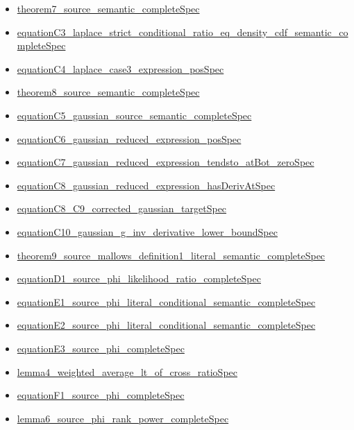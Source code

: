 \documentclass[10pt]{article}
\begin{document}
\begin{itemize}[leftmargin=1.2em]
\begin{itemize}[leftmargin=1.2em]
\item \hyperlink{source-claim-aceb5e75cb75d8b8}{theorem7\_source\_semantic\_completeSpec}
\item \hyperlink{source-claim-fb611bb534f07b11}{equationC3\_laplace\_strict\_conditional\_ratio\_eq\_density\_cdf\_semantic\_completeSpec}
\item \hyperlink{source-claim-29d2b7baa5996f3d}{equationC4\_laplace\_case3\_expression\_posSpec}
\item \hyperlink{source-claim-33bdbb546218e99a}{theorem8\_source\_semantic\_completeSpec}
\item \hyperlink{source-claim-43364c7dea10aac0}{equationC5\_gaussian\_source\_semantic\_completeSpec}
\item \hyperlink{source-claim-c25f59d1a0e8be35}{equationC6\_gaussian\_reduced\_expression\_posSpec}
\item \hyperlink{source-claim-4d39c9a7a45156fa}{equationC7\_gaussian\_reduced\_expression\_tendsto\_atBot\_zeroSpec}
\item \hyperlink{source-claim-2c9d403cd319b538}{equationC8\_gaussian\_reduced\_expression\_hasDerivAtSpec}
\item \hyperlink{source-claim-4139a609895b0de6}{equationC8\_C9\_corrected\_gaussian\_targetSpec}
\item \hyperlink{source-claim-7a440699a84fb997}{equationC10\_gaussian\_g\_inv\_derivative\_lower\_boundSpec}
\item \hyperlink{source-claim-d732fbc16f2ecdeb}{theorem9\_source\_mallows\_definition1\_literal\_semantic\_completeSpec}
\item \hyperlink{source-claim-7751231944a77b74}{equationD1\_source\_phi\_likelihood\_ratio\_completeSpec}
\item \hyperlink{source-claim-c7560a9682e8906d}{equationE1\_source\_phi\_literal\_conditional\_semantic\_completeSpec}
\item \hyperlink{source-claim-73dd5d1917ec1a7c}{equationE2\_source\_phi\_literal\_conditional\_semantic\_completeSpec}
\item \hyperlink{source-claim-027748e89e133285}{equationE3\_source\_phi\_completeSpec}
\item \hyperlink{source-claim-f5654e8ee63c4d5d}{lemma4\_weighted\_average\_lt\_of\_cross\_ratioSpec}
\item \hyperlink{source-claim-7e7ac58d3e77e0cc}{equationF1\_source\_phi\_completeSpec}
\item \hyperlink{source-claim-7ef5e5254a6c73ab}{lemma6\_source\_phi\_rank\_power\_completeSpec}

\end{itemize}
\end{itemize}
\end{document}
